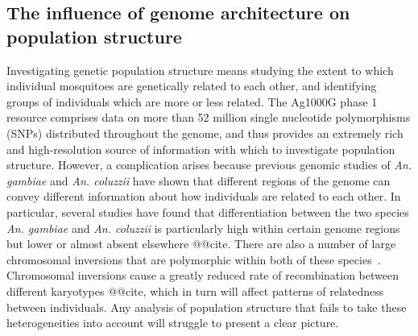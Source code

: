 \documentclass[a4paper,11pt,abstracton,hidelinks]{scrartcl}
\begin{document}
\subsection{The influence of genome architecture on population structure}\label{subsec:treescan}


Investigating genetic population structure means studying the extent to which individual mosquitoes are genetically related to each other, and identifying groups of individuals which are more or less related.
%
The Ag1000G phase 1 resource comprises data on more than 52 million single nucleotide polymorphisms (SNPs) distributed throughout the genome, and thus provides an extremely rich and high-resolution source of information with which to investigate population structure.
%
However, a complication arises because previous genomic studies of \textit{An. gambiae} and \textit{An. coluzzii} have shown that different regions of the genome can convey different information about how individuals are related to each other.
%
In particular, several studies have found that differentiation between the two species \textit{An. gambiae} and \textit{An. coluzzii} is particularly high within certain genome regions but lower or almost absent elsewhere @@cite.
%
There are also a number of large chromosomal inversions that are polymorphic within both of these species~\parencite{dellaTorre2001}.
%
Chromosomal inversions cause a greatly reduced rate of recombination between different karyotypes @@cite, which in turn will affect patterns of relatedness between individuals.
%
Any analysis of population structure that fails to take these heterogeneities into account will struggle to present a clear picture.
%
\end{document}
